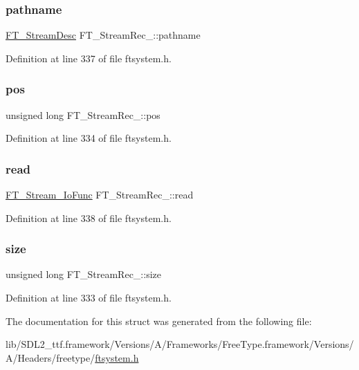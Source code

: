 \subsubsection{\texorpdfstring{pathname}{pathname}}
{\footnotesize\ttfamily \mbox{\hyperlink{ftsystem_8h_ad7ddff377e42bfb38bec17f11fa75911}{F\+T\+\_\+\+Stream\+Desc}} F\+T\+\_\+\+Stream\+Rec\+\_\+\+::pathname}



Definition at line 337 of file ftsystem.\+h.

\mbox{\label{struct_f_t___stream_rec___a5bf82c2ff4554752edfeec442fba2f33}} 
\subsubsection{\texorpdfstring{pos}{pos}}
{\footnotesize\ttfamily unsigned long F\+T\+\_\+\+Stream\+Rec\+\_\+\+::pos}



Definition at line 334 of file ftsystem.\+h.

\mbox{\label{struct_f_t___stream_rec___af724049d0258d4988c2b11c3a08b1b05}} 
\subsubsection{\texorpdfstring{read}{read}}
{\footnotesize\ttfamily \mbox{\hyperlink{ftsystem_8h_a1909d9c00ba62592c047a9868e5a6b0b}{F\+T\+\_\+\+Stream\+\_\+\+Io\+Func}} F\+T\+\_\+\+Stream\+Rec\+\_\+\+::read}



Definition at line 338 of file ftsystem.\+h.

\mbox{\label{struct_f_t___stream_rec___ab00e3cf802c950d0ca5a022a06953123}} 
\subsubsection{\texorpdfstring{size}{size}}
{\footnotesize\ttfamily unsigned long F\+T\+\_\+\+Stream\+Rec\+\_\+\+::size}



Definition at line 333 of file ftsystem.\+h.



The documentation for this struct was generated from the following file\+:\begin{DoxyCompactItemize}
\item 
lib/\+S\+D\+L2\+\_\+ttf.\+framework/\+Versions/\+A/\+Frameworks/\+Free\+Type.\+framework/\+Versions/\+A/\+Headers/freetype/\mbox{\hyperlink{ftsystem_8h}{ftsystem.\+h}}\end{DoxyCompactItemize}
